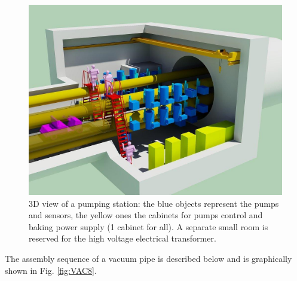 \begin{figure}
\begin{center}
\includegraphics[width=\textwidth]{Sec_SiteInfra/Figures/VAC7.jpg}
\caption{3D view of a pumping station: the blue objects represent the pumps and sensors, the yellow ones the cabinets for pumps control and baking power supply (1 cabinet for all). A separate small room is reserved for the high voltage electrical transformer.}
\label{fig:VAC7}
\end{center}
\end{figure}

The assembly sequence of a vacuum pipe is described below and is graphically shown in Fig. \ref{fig:VAC8}.

